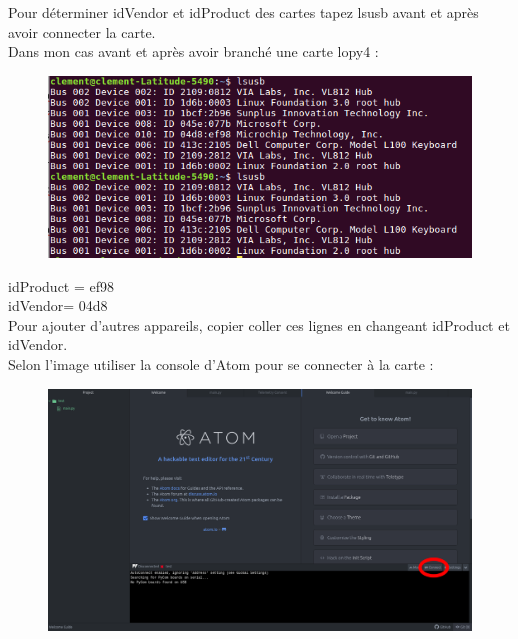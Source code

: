 \documentclass{article}
\begin{document}
 Pour déterminer idVendor et idProduct des cartes tapez lsusb avant et après avoir connecter la carte. \\

 Dans mon cas avant et après avoir branché une carte lopy4 :
 
 \begin{figure}[H]
\begin{center}
\advance\leftskip-3cm
\advance\rightskip-3cm
\includegraphics[keepaspectratio=true,scale=0.5]{lsusb.png}
\label{visina8}
\end{center}\end{figure}

idProduct = ef98\\
idVendor= 04d8\\

Pour ajouter d'autres appareils, copier coller ces lignes en changeant idProduct et idVendor. \\


Selon l'image utiliser la console d'Atom pour se connecter à la carte :



  \begin{figure}[H]
\begin{center}
\advance\leftskip-3cm
\advance\rightskip-3cm
\includegraphics[keepaspectratio=true,scale=0.2]{atom_connect.png}
\label{visina8}
\end{center}\end{figure}
\end{document}
